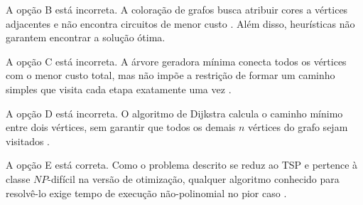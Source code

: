 \documentclass[12pt,a4paper]{article}
\begin{document}
A opção B está incorreta.
A coloração de grafos busca atribuir cores a vértices adjacentes e não encontra circuitos de menor custo \parencite[prob.~34-3]{clrs2022}.
Além disso, heurísticas não garantem encontrar a solução ótima.

A opção C está incorreta.
A árvore geradora mínima conecta todos os vértices com o menor custo total,
mas não impõe a restrição de formar um caminho simples que visita cada etapa exatamente uma vez \parencite[cap.~21]{clrs2022}.

A opção D está incorreta.
O algoritmo de Dijkstra calcula o caminho mínimo entre dois vértices,
sem garantir que todos os demais $n$ vértices do grafo sejam visitados \parencite[cap.~22]{clrs2022}.

A opção E está correta.
Como o problema descrito se reduz ao TSP e pertence à classe $NP$-difícil na versão de otimização,
qualquer algoritmo conhecido para resolvê-lo exige tempo de execução não-polinomial no pior caso \parencite[seç.~34.5.4]{clrs2022}.
\end{document}
